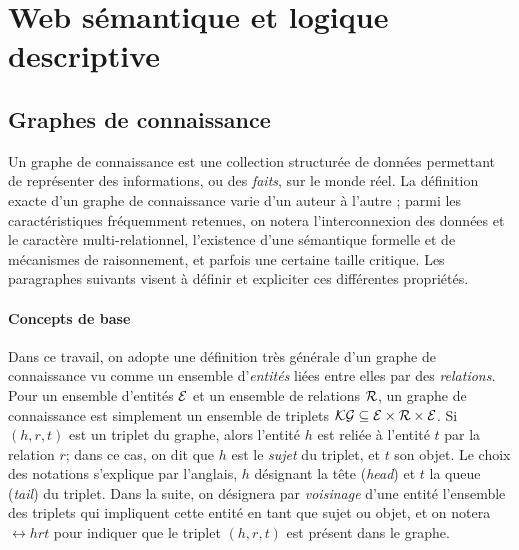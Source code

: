 \label{chap:revue}


\section{Web sémantique et logique descriptive}
\label{sec:dl}

\subsection{Graphes de connaissance}





Un graphe de connaissance est une collection structurée de données permettant de représenter des informations, ou des \textit{faits}, sur le monde réel. La définition exacte d'un graphe de connaissance varie d'un auteur à l'autre \cite{ehrlinger2016towards}; parmi les caractéristiques fréquemment retenues, on notera l'interconnexion des données et le caractère multi-relationnel, l'existence d'une sémantique formelle et de mécanismes de raisonnement, et parfois une certaine taille critique. Les paragraphes suivants visent à définir et expliciter ces différentes propriétés.


\paragraph{Concepts de base}

Dans ce travail, on adopte une définition très générale d'un graphe de connaissance vu comme un ensemble d'\textit{entités} liées entre elles par des \textit{relations}. Pour un ensemble d'entités $\mathcal{E}$ et un ensemble de relations $\mathcal{R}$, un graphe de connaissance est simplement un ensemble de triplets $\mathcal{KG} \subseteq \mathcal{E} \times \mathcal{R} \times \mathcal{E}$. Si $(h, r, t)$ est un triplet du graphe, alors l'entité $h$ est reliée à l'entité $t$ par la relation $r$; dans ce cas, on dit que $h$ est le \textit{sujet} du triplet, et $t$ son objet. Le choix des notations s'explique par l'anglais, $h$ désignant la tête (\textit{head}) et $t$ la queue (\textit{tail}) du triplet. Dans la suite, on désignera par \textit{voisinage} d'une entité l'ensemble des triplets qui impliquent cette entité en tant que sujet ou objet, et on notera $\rel{h}{r}{t}$ pour indiquer que le triplet $(h, r, t)$ est présent dans le graphe.

